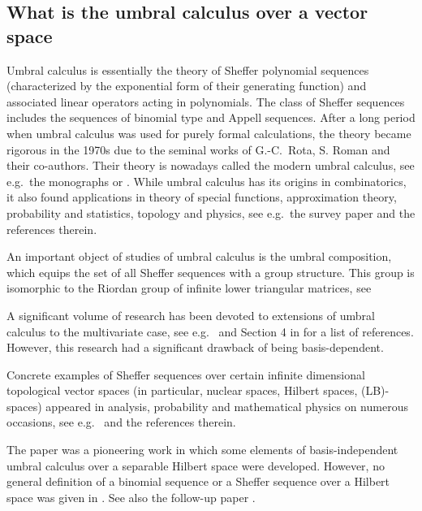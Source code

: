 \documentclass[12pt]{article}
\theoremstyle{remark}
\theoremstyle{remark}
\theoremstyle{remark}
\begin{document}
\subsection{What is the umbral calculus over a vector space}

Umbral calculus  is essentially the theory of Sheffer polynomial sequences (characterized by the exponential form of their generating function) and associated  linear operators acting in polynomials. The class of Sheffer sequences includes the sequences of binomial type and  Appell sequences.  After a long period when  umbral calculus was used for purely formal calculations, the theory became rigorous in the 1970s due to the seminal 
 works of  G.-C.~Rota, S. Roman and their co-authors. Their theory is nowadays called the modern  umbral calculus, see e.g.\ the monographs \cite{Roman,C} or \cite[Chapter~4]{KRY}.  While umbral calculus has its origins in combinatorics, it also found applications in  theory of special functions, approximation theory, probability and statistics, topology and physics, see e.g.\ the survey paper \cite{DiBL} and the references therein. 
 
 An important 
 object of studies of  umbral calculus is the umbral composition, which 
equips the set of all Sheffer  sequences with a group structure. This group is isomorphic to the Riordan group of infinite lower triangular matrices, see \cite{SGWW,ShapiroBook,HeHsuShiue,WangZhang}

A significant volume of research  has been devoted to extensions of umbral calculus to the multivariate case, see e.g.\ \cite{RomanIII} and Section 4 in \cite{DiBL} for a list of references. However, this research had a significant drawback of being basis-dependent. 

Concrete examples of Sheffer  sequences over certain  infinite dimensional topological vector spaces (in particular, nuclear spaces, Hilbert spaces, (LB)-spaces) appeared in analysis, probability and mathematical physics on numerous occasions,  see e.g.\ \cite{ADKS,BK,Hida,FLO,Lytvynov2003,KSWY,Grothaus,ItoKubo,Stirlingoperators,Jansen1} and the references therein. 



The paper \cite{DBLR} was a pioneering  work in which some elements of basis-independent umbral calculus over a separable Hilbert space were developed.   However, no general definition of a binomial sequence or a Sheffer sequence over a Hilbert space was given in \cite{DBLR}. See also the follow-up paper \cite{DL}. 
\end{document}
